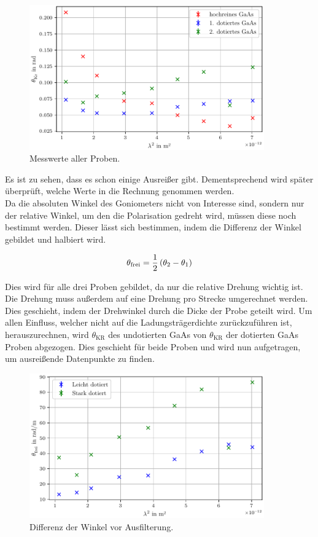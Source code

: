 \begin{figure}[H]
    \centering
    \includegraphics[width=0.9\textwidth]{Kristallwinkel.pdf}
    \caption{Messwerte aller Proben.}
    \label{fig:roh}
\end{figure}

\noindent Es ist zu sehen, dass es schon einige Ausreißer gibt. Dementsprechend wird später überprüft, welche 
Werte in die Rechnung genommen werden.\\
\noindent Da die absoluten Winkel des Goniometers nicht von Interesse sind, sondern nur der relative 
Winkel, um den die Polarisation gedreht wird, müssen diese noch bestimmt werden. Dieser lässt sich 
bestimmen, indem die Differenz der Winkel gebildet und halbiert wird.

\begin{equation}
    \centering
    \theta_\text{frei}=\frac{1}{2} \left(\theta_2 - \theta_1 \right)
    \label{eqn:theta_frei}
\end{equation}

\noindent Dies wird für alle drei Proben gebildet, da nur die relative Drehung wichtig ist. 
Die Drehung muss außerdem auf eine Drehung pro Strecke umgerechnet werden. Dies geschieht, indem der Drehwinkel 
durch die Dicke der Probe geteilt wird.
Um allen Einfluss, welcher nicht auf die Ladungsträgerdichte zurückzuführen ist, herauszurechnen, wird 
$\theta_\text{KR}$ des undotierten GaAs von $\theta_\text{KR}$ der dotierten GaAs Proben abgezogen. 
Dies geschieht für beide Proben und wird nun aufgetragen, um ausreißende Datenpunkte zu finden.

\begin{figure}[H]
    \centering
    \includegraphics[width=0.9\textwidth]{Rohplot.pdf}
    \caption{Differenz der Winkel vor Ausfilterung.}
    \label{fig:pre}
\end{figure}

